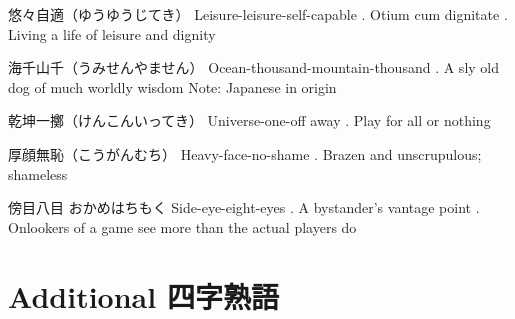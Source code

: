 \par{悠々自適（ゆうゆうじてき） \hfill\break
Leisure-leisure-self-capable \hfill{}. Otium cum dignitate \hfill{}. Living a life of leisure and dignity }

\par{海千山千（うみせんやません） \hfill\break
Ocean-thousand-mountain-thousand \hfill{}. A sly old dog of much worldly wisdom \hfill\break
Note: Japanese in origin }

\par{乾坤一擲（けんこんいってき） \hfill\break
Universe-one-off away \hfill{}. Play for all or nothing }

\par{厚顔無恥（こうがんむち） \hfill\break
Heavy-face-no-shame \hfill{}. Brazen and unscrupulous; shameless }

\par{傍目八目 \hfill\break
おかめはちもく \hfill\break
Side-eye-eight-eyes \hfill{}. A bystander's vantage point \hfill{}. Onlookers of a game see more than the actual players do }
      
\section{Additional 四字熟語}
  
